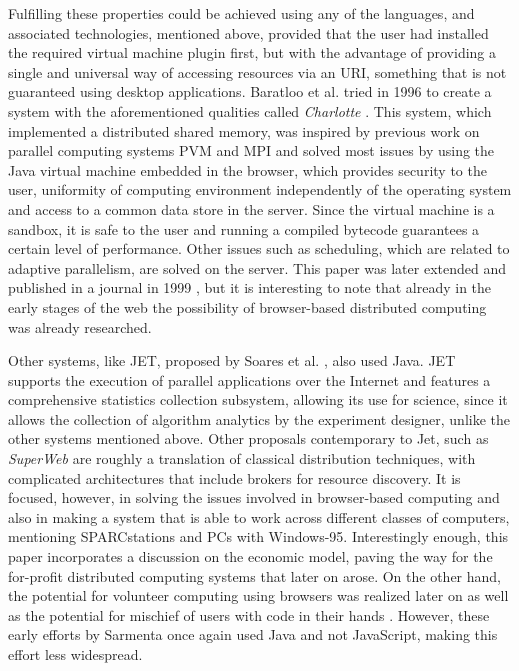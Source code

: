 \documentclass[journal,onecolumn]{IEEEtran}
\begin{document}
Fulfilling these properties could be achieved using any of the
languages, and associated technologies, mentioned above, provided that the user had
installed the required virtual machine plugin first, but with the advantage of
providing a single and universal way of accessing resources via an
URI, something that is not guaranteed using desktop
applications. Baratloo et al. tried in 1996 to create a system with
the aforementioned qualities called {\em Charlotte}
\cite{baratloo1996charlotte}. This system, which implemented a
distributed shared memory, was inspired by previous work
on parallel computing systems PVM and MPI and solved most issues by
using the Java virtual machine embedded in the browser,
which provides
security to the user, uniformity of computing environment
independently of the operating system and access to a common data store in the
server. Since the virtual machine is a sandbox, it is safe to the user
and running a compiled bytecode guarantees a certain level of
performance.
 Other issues such as scheduling, which are related to adaptive
 parallelism, are solved on the server. This
paper was later extended and published in a journal in 1999
\cite{baratloo1999charlotte}, but it is interesting to note that
already in the early stages of the web the possibility of
browser-based distributed computing was already researched.

Other systems, like JET, proposed by Soares et
al. \cite{soares1998get}, also used Java. JET supports
the execution of parallel applications over the Internet and features
a comprehensive statistics collection subsystem, allowing its use for science,
since it allows the collection of algorithm analytics by the
experiment designer, unlike the other systems mentioned
above. Other proposals contemporary to Jet, such as {\em SuperWeb}
\cite{alexandrov1997superweb} are roughly a translation of classical
distribution techniques, with complicated architectures that include
brokers for resource discovery. It is focused, however, in solving the
issues involved in browser-based computing and also in making a system
that is able to work across different classes of computers, mentioning
SPARCstations and PCs with Windows-95. Interestingly enough, this
paper incorporates a discussion on the economic model, paving the way
for the for-profit distributed computing systems that later on
arose. On the other hand, the potential for volunteer computing using
browsers was realized
later on \cite{sarmenta-bayanihan} as well as the potential for
mischief of users with code in their hands
\cite{sarmenta-sabotagetolerance}. However, these early efforts by
Sarmenta once again used Java and not JavaScript, making this effort
less widespread.
\end{document}
